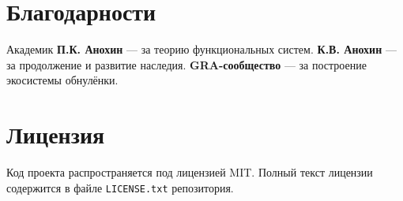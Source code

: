 \documentclass[11pt,a4paper]{article}
\begin{document}
\section*{Благодарности}

Академик \textbf{П.К. Анохин} — за теорию функциональных систем.  
\textbf{К.В. Анохин} — за продолжение и развитие наследия.  
\textbf{GRA-сообщество} — за построение экосистемы обнулёнки.

\section*{Лицензия}

Код проекта распространяется под лицензией MIT. Полный текст лицензии содержится в файле \texttt{LICENSE.txt} репозитория.
\end{document}
